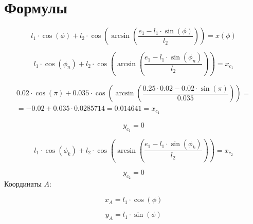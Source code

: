 \section{Формулы}

\begin{equation}\label{eq:formul}
	l_1\cdot\cos(\phi)+l_2\cdot\cos\left(\arcsin\left(\dfrac{e_1-l_1\cdot\sin(\phi)}{l_2}\right)\right)=x(\phi)
\end{equation}

\begin{figure}[H]
	\centering
\end{figure}
\newpage
\begin{equation}\label{eq:xc1}
	l_1\cdot\cos(\phi_n)+l_2\cdot\cos\left(\arcsin\left(\dfrac{e_1-l_1\cdot\sin(\phi_n)}{l_2}\right)\right)=x_{c_1}
\end{equation}

\begin{multline}\label{eq:xc1calc}
	0.02\cdot\cos(\pi)+0.035\cdot\cos\left(\arcsin\left(\dfrac{0.25\cdot 0.02-0.02\cdot\sin(\pi)}{0.035}\right)\right)=\\
	=-0.02+0.035\cdot0.0285714=0.014641=x_{c_1}
\end{multline}

\begin{equation}\label{eq:yc1}
	y_{c_1} = 0
\end{equation}

\begin{equation}\label{eq:xc2}
	l_1\cdot\cos(\phi_k)+l_2\cdot\cos\left(\arcsin\left(\dfrac{e_1-l_1\cdot\sin(\phi_k)}{l_2}\right)\right)=x_{c_2}
\end{equation}

\begin{equation}\label{eq:yc2}
	y_{c_2}=0
\end{equation}
\newpage
Координаты $ A $:

\begin{equation}\label{eq:xA}
	x_A=l_1\cdot\cos(\phi)
\end{equation}

\begin{figure}[H]
	\centering
\end{figure}
\newpage
\begin{equation}\label{eq:yA}
	y_A=l_1\cdot\sin(\phi)
\end{equation}

